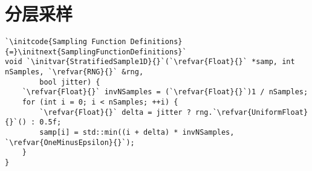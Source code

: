 \section{分层采样}\label{sec:分层采样}
\begin{lstlisting}
`\initcode{Sampling Function Definitions}{=}\initnext{SamplingFunctionDefinitions}`
void `\initvar{StratifiedSample1D}{}`(`\refvar{Float}{}` *samp, int nSamples, `\refvar{RNG}{}` &rng,
        bool jitter) {
    `\refvar{Float}{}` invNSamples = (`\refvar{Float}{}`)1 / nSamples;
    for (int i = 0; i < nSamples; ++i) {
        `\refvar{Float}{}` delta = jitter ? rng.`\refvar{UniformFloat}{}`() : 0.5f;
        samp[i] = std::min((i + delta) * invNSamples, `\refvar{OneMinusEpsilon}{}`);
    }
}
\end{lstlisting}